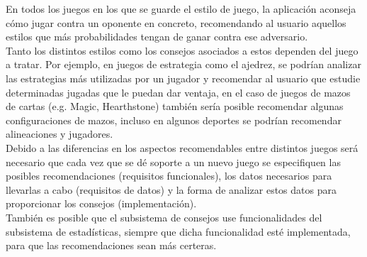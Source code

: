 En todos los juegos en los que se guarde el estilo de juego, la aplicación
aconseja cómo jugar contra un oponente en concreto, recomendando al usuario aquellos
estilos que más probabilidades tengan de ganar contra ese adversario.\\

Tanto los distintos estilos como los consejos asociados a estos dependen
del juego a tratar. Por ejemplo, en juegos de estrategia como el ajedrez, se podrían
analizar las estrategias más utilizadas por un jugador y recomendar al usuario
que estudie determinadas jugadas que le puedan dar ventaja, en el caso de juegos
de mazos de cartas (e.g. Magic, Hearthstone) también sería posible recomendar algunas
configuraciones de mazos, incluso en algunos deportes se podrían recomendar
alineaciones y jugadores.\\

Debido a las diferencias en los aspectos recomendables entre distintos juegos será
necesario que cada vez que se dé soporte a un nuevo juego se especifiquen 
las posibles recomendaciones (requisitos funcionales), los datos necesarios
para llevarlas a cabo (requisitos de datos) y la forma de analizar estos datos
para proporcionar los consejos (implementación).\\

También es posible que el subsistema de consejos use funcionalidades del subsistema
de estadísticas, siempre que dicha funcionalidad esté implementada, para que las
recomendaciones sean más certeras.\\

